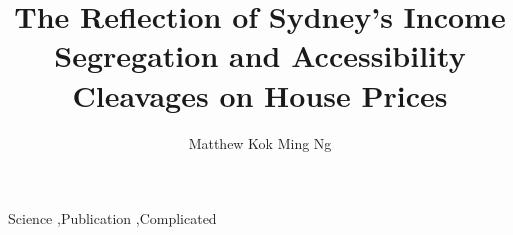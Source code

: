 \documentclass[preprint,review,12pt]{elsarticle}
\begin{document}
\begin{frontmatter}


\title{The Reflection of Sydney's Income Segregation and Accessibility Cleavages on House Prices}

\author[address1]{Matthew Kok Ming Ng}


\address[address1]{City Futures Research Centre \\ University of New South Wales}

\linenumbers
\begin{abstract} %


\end{abstract}

\begin{keyword}
Science \sep Publication \sep Complicated

\end{keyword}

\end{frontmatter}





\end{document}
